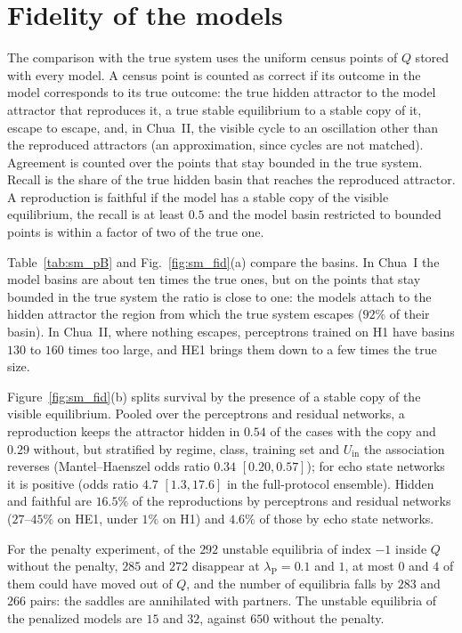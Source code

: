 \documentclass[aip,cha,preprint,amsmath,amssymb,longbibliography]{revtex4-2}
\newcommand{\Uin}{U_{\mathrm{in}}}
\begin{document}


\section{Fidelity of the models}

The comparison with the true system uses the uniform census points of $Q$ stored with every model. A census point is counted
as correct if its outcome in the model corresponds to its true outcome: the true hidden attractor to the model attractor that
reproduces it, a true stable equilibrium to a stable copy of it, escape to escape, and, in Chua~II, the visible cycle to an
oscillation other than the reproduced attractors (an approximation, since cycles are not matched). Agreement is counted over
the points that stay bounded in the true system. Recall is the share of the true hidden basin that reaches the reproduced
attractor. A reproduction is faithful if the model has a stable copy of the visible equilibrium, the recall is at least
$0.5$ and the model basin restricted to bounded points is within a factor of two of the true one.

Table~\ref{tab:sm_pB} and Fig.~\ref{fig:sm_fid}(a) compare the basins. In Chua~I the model basins are about ten times the
true ones, but on the points that stay bounded in the true system the ratio is close to one: the models attach to the hidden
attractor the region from which the true system escapes ($92\%$ of their basin). In Chua~II, where nothing escapes,
perceptrons trained on H1 have basins $130$ to $160$ times too large, and HE1 brings them down to a few times the true size.

Figure~\ref{fig:sm_fid}(b) splits survival by the presence of a stable copy of the visible equilibrium. Pooled over the
perceptrons and residual networks, a reproduction keeps the attractor hidden in $0.54$ of the cases with the copy and $0.29$
without, but stratified by regime, class, training set and $\Uin$ the association reverses (Mantel--Haenszel odds ratio
$0.34$ $[0.20,0.57]$); for echo state networks it is positive (odds ratio $4.7$ $[1.3,17.6]$ in the full-protocol ensemble).
Hidden and faithful are $16.5\%$ of the reproductions by perceptrons and residual networks ($27$--$45\%$ on HE1, under $1\%$ on
H1) and $4.6\%$ of those by echo state networks.

For the penalty experiment, of the $292$ unstable equilibria of index $-1$ inside $Q$ without the penalty, $285$ and $272$
disappear at $\lambda_{\mathrm{P}}=0.1$ and $1$, at most $0$ and $4$ of them could have moved out of $Q$, and the number of
equilibria falls by $283$ and $266$ pairs: the saddles are annihilated with partners. The unstable equilibria of the
penalized models are $15$ and $32$, against $650$ without the penalty.
\end{document}
